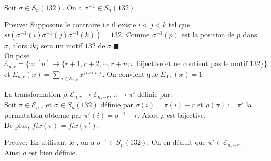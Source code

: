 \begin{lemme} \label{l100}
	Soit $\sigma \in S_{n}(132)$. On a $\sigma^{-1}\in S_{n}(132)$
\end{lemme}
Preuve: Supposons le contraire i.e il existe $i<j<k$ tel que $st(\sigma^{-1}(i)\sigma^{-1}(j)\sigma^{-1}(k))=132$. Comme $\sigma^{-1}(p)$ est la position de $p$ dans $\sigma$, alors $ikj$ sera un motif $132$ de $\sigma$.$\blacksquare$\vspace{5pt}\\
On pose $\mathcal{E}_{n,r} = \{\pi: [n] \longrightarrow \{ r+1, r+2, \cdots, r+n ; \pi \text{ bijective et ne contient pas le motif }132\}\} $ \\ et $E_{n, r}(x) = \sum\limits_{\sigma\in \mathcal{E}_{n, r}}x^{fix(\sigma)}$\vspace{10pt}. On convient que $E_{0, r}(x)=1$\\
\begin{proposition}\label{p6}
	La transformation $\rho: \mathcal{E}_{n,r} \longrightarrow \mathcal{E}_{n, -r}$, $\pi \longrightarrow \pi'$ définie par:\\
	Soit $\pi \in \mathcal{E}_{n,r} $ et $\sigma \in S_{n}(132)$ définie par $\sigma(i) = \pi(i) - r$ et $\rho(\pi):=\pi'$ la permutation obtenue par $\pi'(i) = \sigma^{-1}-r$. Alors $\rho$ est bijective.\\
	De plus, $fix(\pi)=fix(\pi')$.
\end{proposition}
Preuve: En utilisant le , on a $\sigma^{-1}\in S_{n}(132)$. On en déduit que $\pi'\in \mathcal{E}_{n,-r}$. \\Ainsi $\rho$ est bien définie.\vspace{5pt}\\
